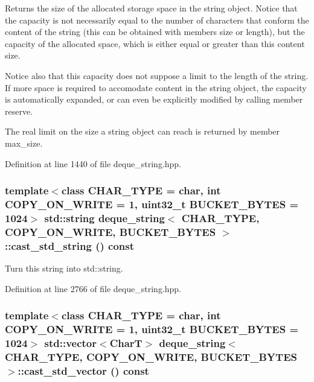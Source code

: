 Returns the size of the allocated storage space in the string object. Notice that the capacity is not necessarily equal to the number of characters that conform the content of the string (this can be obtained with members size or length), but the capacity of the allocated space, which is either equal or greater than this content size.

Notice also that this capacity does not suppose a limit to the length of the string. If more space is required to accomodate content in the string object, the capacity is automatically expanded, or can even be explicitly modified by calling member reserve.

The real limit on the size a string object can reach is returned by member max\_\-size. 

Definition at line 1440 of file deque\_\-string.hpp.\hypertarget{classdeque__string_cf24d0ac8c5ec359d3a5732efdd0b98b}{
\subsubsection[{cast\_\-std\_\-string}]{\setlength{\rightskip}{0pt plus 5cm}template$<$class CHAR\_\-TYPE  = char, int COPY\_\-ON\_\-WRITE = 1, uint32\_\-t BUCKET\_\-BYTES = 1024$>$ std::string {\bf deque\_\-string}$<$ CHAR\_\-TYPE, COPY\_\-ON\_\-WRITE, BUCKET\_\-BYTES $>$::cast\_\-std\_\-string () const}}
\label{classdeque__string_cf24d0ac8c5ec359d3a5732efdd0b98b}


Turn this string into std::string. 

Definition at line 2766 of file deque\_\-string.hpp.\hypertarget{classdeque__string_bdea4c4f98fb0c2f65a138cdef8d0331}{
\subsubsection[{cast\_\-std\_\-vector}]{\setlength{\rightskip}{0pt plus 5cm}template$<$class CHAR\_\-TYPE  = char, int COPY\_\-ON\_\-WRITE = 1, uint32\_\-t BUCKET\_\-BYTES = 1024$>$ std::vector$<$CharT$>$ {\bf deque\_\-string}$<$ CHAR\_\-TYPE, COPY\_\-ON\_\-WRITE, BUCKET\_\-BYTES $>$::cast\_\-std\_\-vector () const}}
\label{classdeque__string_bdea4c4f98fb0c2f65a138cdef8d0331}


